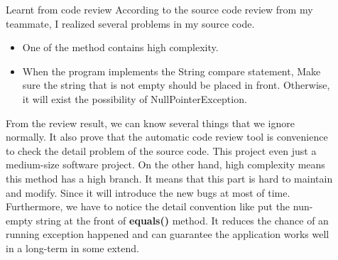 \documentclass[final]{beamer}
\newlength{\sepwid}
\newlength{\onecolwid}
\newlength{\twocolwid}
\begin{document}
\begin{frame}[t]
\begin{columns}[t]
\begin{column}{\twocolwid}
\begin{columns}[t,totalwidth=\twocolwid]
\begin{column}{\onecolwid}
\vspace{-2cm}
\begin{block}{Learnt from code review}
According to the source code review from my teammate, I realized several problems in my source code.
\vspace{-2cm}
\begin{itemize}
\item One of the method contains high complexity.
\item When the program implements the String compare statement, Make sure the string that is not empty should be placed in front. Otherwise, it will exist the possibility of NullPointerException.
\end{itemize}
From the review result, we can know several things that we ignore normally. It also prove that the automatic code review tool is convenience to check the detail problem of the source code. This project even just a medium-size software project. On the other hand, high complexity means this method has a high branch. It means that this part is hard to maintain and modify. Since it will introduce the new bugs at most of time. Furthermore, we have to notice the detail convention like put the nun-empty string at the front of \textbf{equals()} method. It reduces the chance of an running exception happened and  can guarantee the application works well in a long-term in some extend.

\end{block}


\end{column} %

\end{columns} %

\end{column} %

\begin{column}{\sepwid}\end{column} %

\begin{column}{\onecolwid} %



\end{column}
\end{columns}
\end{frame}
\end{document}

